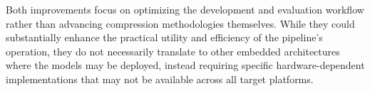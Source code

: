 Both improvements focus on optimizing the development and evaluation workflow rather than advancing compression methodologies themselves. While they could substantially enhance the practical utility and efficiency of the pipeline's operation, they do not necessarily translate to other embedded architectures where the models may be deployed, instead requiring specific hardware-dependent implementations that may not be available across all target platforms.